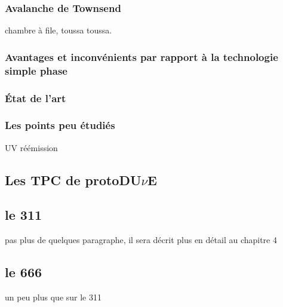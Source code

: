            \subsubsection{Avalanche de Townsend}
                chambre à file, toussa toussa.
            \subsubsection{Avantages et inconvénients par rapport à la technologie simple phase}\label{sec::townsend_avalanche}
            \subsubsection{État de l'art}
            \subsubsection{Les points peu étudiés}
                UV réémission
        
        \subsection{Les TPC de \texorpdfstring{protoDU$\nu$E}{protoDUNE}}
            \subsection{le 311}
                pas plus de quelques paragraphe, il sera décrit plus en détail au chapitre 4
            \subsection{le 666}
                un peu plus que sur le 311